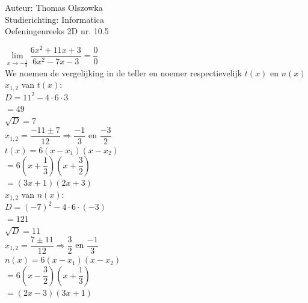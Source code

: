 \documentclass[a4paper]{article}
\newcommand{\llim}{\lim\limits}
\begin{document}
\noindent \large Auteur: Thomas Olszowka \\
\noindent \large Studierichting: Informatica \\
\noindent \large Oefeningenreeks 2D nr. 10.5  \\



\medskip

\normalsize

$\llim_{x \rightarrow -\tfrac{1}{3}} \dfrac{6x^2+11x+3}{6x^2-7x-3} = \dfrac{0}{0}$\\

We noemen de vergelijking in de teller en noemer respectievelijk $t(x)$ en $n(x)$\\

$x_{1,2}$ van $t(x)$: \\

$D = 11^2 - 4\cdot6\cdot3$ \\

$= 49$ \\

$\sqrt{D} = 7$ \\

$x_{1,2} = \dfrac{-11 \pm 7}{12} \Rightarrow \dfrac{-1}{3}$ en $\dfrac{-3}{2}$ \\

$t(x) = 6(x-x_1)(x-x_2)$ \\

$= 6\left(x+\dfrac{1}{3}\right)\left(x+\dfrac{3}{2}\right)$ \\

$= (3x+1)(2x+3)$ \\

$x_{1,2}$ van $n(x)$: \\

$D = (-7)^2 - 4\cdot6\cdot(-3)$ \\

$= 121$ \\

$\sqrt{D} = 11$ \\

$x_{1,2} = \dfrac{7 \pm11}{12} \Rightarrow \dfrac{3}{2}$ en $\dfrac{-1}{3}$ \\

$n(x) = 6(x-x_1)(x-x_2)$ \\

$= 6\left(x-\dfrac{3}{2}\right)\left(x+\dfrac{1}{3}\right)$ \\

$= (2x-3)(3x+1)$ \\
\end{document}
